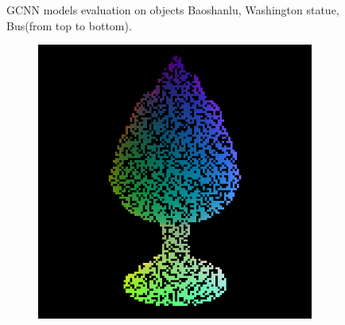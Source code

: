 \begin{figure}
	\decoRule
	\caption{GCNN models evaluation on objects Baoshanlu, Washington statue, Bus(from top to bottom).}
	\label{fig:gcnn-eval-more}
\end{figure}



\begin{figure}
	\centering
	\begin{subfigure}[b]{0.24\linewidth}
		\includegraphics[width=\linewidth]{./Figures/gcnn_synthetic/fancy_eval_2_point_cloud_noise.png}
	\end{subfigure}
	\begin{subfigure}[b]{0.24\linewidth}

\end{subfigure}
\end{figure}
